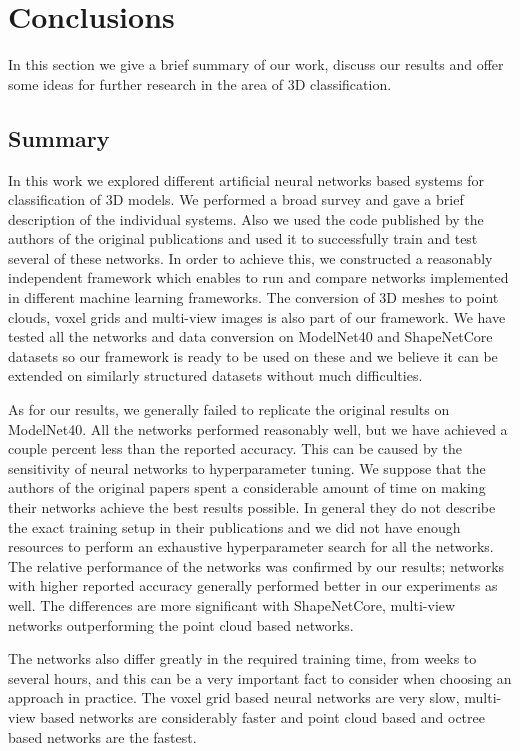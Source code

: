\chapter{Conclusions}
\label{sec:chap6}
In this section we give a brief summary of our work, discuss our results and offer some ideas for further research in the area of 3D classification.
\section{Summary}
In this work we explored different artificial neural networks based systems for classification of 3D models. We performed a broad survey and gave a brief description of the individual systems. Also we used the code published by the authors of the original publications and used it to successfully train and test several of these networks. In order to achieve this, we constructed a reasonably independent framework which enables to run and compare networks implemented in different machine learning frameworks. The conversion of 3D meshes to point clouds, voxel grids and multi-view images is also part of our framework. We have tested all the networks and data conversion on ModelNet40 and ShapeNetCore datasets so our framework is ready to be used on these and we believe it can be extended on similarly structured datasets without much difficulties. \par
As for our results, we generally failed to replicate the original results on ModelNet40. All the networks performed reasonably well, but we have achieved a couple percent less than the reported accuracy. This can be caused by the sensitivity of neural networks to hyperparameter tuning. We suppose that the authors of the original papers spent a considerable amount of time on  making their networks achieve the best results possible. In general they do not describe the exact training setup in their publications and we did not have enough resources to perform an exhaustive hyperparameter search for all the networks.
The relative performance of the networks was confirmed by our results; networks with higher reported accuracy generally performed better in our experiments as well. The differences are more significant with ShapeNetCore, multi-view networks outperforming the point cloud based networks. \par
 The networks also differ greatly in the required training time, from weeks to several hours, and this can be a very important fact to consider when choosing an approach in practice. The voxel grid based neural networks are very slow, multi-view based networks are considerably faster and point cloud based and octree based networks are the fastest. 

